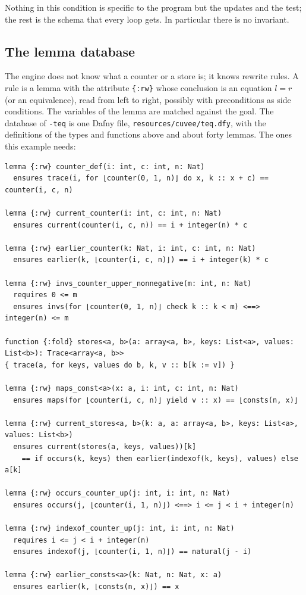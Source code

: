 \documentclass[11pt,a4paper]{article}
\begin{document}
Nothing in this condition is specific to the program but the updates and the test; the rest is the schema that every
loop gets. In particular there is no invariant.

\subsection{The lemma database}

The engine does not know what a counter or a store is; it knows rewrite rules. A rule is a lemma with the attribute
\lstinline|{:rw}| whose conclusion is an equation $l = r$ (or an equivalence), read from left to right, possibly
with preconditions as side conditions. The variables of the lemma are matched against the goal. The database of
\texttt{-teq} is one Dafny file, \texttt{resources/cuvee/teq.dfy}, with the definitions of the types and
functions above and about forty lemmas. The ones this example needs:
\begin{lstlisting}
lemma {:rw} counter_def(i: int, c: int, n: Nat)
  ensures trace(i, for ⌊counter(0, 1, n)⌋ do x, k :: x + c) == counter(i, c, n)

lemma {:rw} current_counter(i: int, c: int, n: Nat)
  ensures current(counter(i, c, n)) == i + integer(n) * c

lemma {:rw} earlier_counter(k: Nat, i: int, c: int, n: Nat)
  ensures earlier(k, ⌊counter(i, c, n)⌋) == i + integer(k) * c

lemma {:rw} invs_counter_upper_nonnegative(m: int, n: Nat)
  requires 0 <= m
  ensures invs(for ⌊counter(0, 1, n)⌋ check k :: k < m) <==> integer(n) <= m

function {:fold} stores<a, b>(a: array<a, b>, keys: List<a>, values: List<b>): Trace<array<a, b>>
{ trace(a, for keys, values do b, k, v :: b[k := v]) }

lemma {:rw} maps_const<a>(x: a, i: int, c: int, n: Nat)
  ensures maps(for ⌊counter(i, c, n)⌋ yield v :: x) == ⌊consts(n, x)⌋

lemma {:rw} current_stores<a, b>(k: a, a: array<a, b>, keys: List<a>, values: List<b>)
  ensures current(stores(a, keys, values))[k]
    == if occurs(k, keys) then earlier(indexof(k, keys), values) else a[k]

lemma {:rw} occurs_counter_up(j: int, i: int, n: Nat)
  ensures occurs(j, ⌊counter(i, 1, n)⌋) <==> i <= j < i + integer(n)

lemma {:rw} indexof_counter_up(j: int, i: int, n: Nat)
  requires i <= j < i + integer(n)
  ensures indexof(j, ⌊counter(i, 1, n)⌋) == natural(j - i)

lemma {:rw} earlier_consts<a>(k: Nat, n: Nat, x: a)
  ensures earlier(k, ⌊consts(n, x)⌋) == x
\end{lstlisting}
\end{document}
